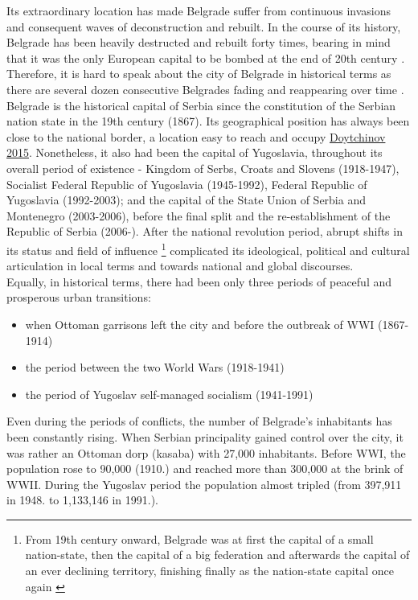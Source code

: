 \documentclass[11pt]{report}
\begin{document}
Its extraordinary location has made Belgrade suffer from continuous invasions and consequent waves of deconstruction and rebuilt. In the course of its history, Belgrade has been heavily destructed and rebuilt forty times, bearing in mind that it was the only European capital to be bombed at the end of 20th century \href{ref}{\citealt{doytchinov_belgrade_2015}}. Therefore, it is hard to speak about the city of Belgrade in historical terms as there are several  dozen  consecutive  Belgrades fading and reappearing over time \href{ref}{\citealt{grozdanic_belgrade_2008}}.
\\
Belgrade is the historical capital of Serbia since the constitution of the Serbian nation state in the 19th century (1867). Its geographical position has always been close to the national border, a location easy to reach and occupy \href{ref}{Doytchinov 2015}.
Nonetheless, it also had been the capital of Yugoslavia, throughout its overall period of existence - Kingdom of Serbs, Croats and Slovens (1918-1947), Socialist Federal Republic of Yugoslavia (1945-1992), Federal Republic of Yugoslavia (1992-2003); and the capital of the State Union of Serbia and Montenegro (2003-2006), before the final split and the re-establishment of the Republic of Serbia (2006-). After the national revolution period, abrupt shifts in its status and field of influence
\footnote{From 19th century onward, Belgrade was at first the capital of a small nation-state, then the capital of a big federation and afterwards the capital of an ever declining territory, finishing finally as the nation-state capital once again \href{ref}{\citealt{hirt_belgrade_2009}}}
complicated its ideological, political and cultural articulation in local terms and towards national and global discourses.
\\

Equally, in historical terms, there had been only three periods of peaceful and prosperous urban transitions:

\begin{itemize}
\item when Ottoman garrisons left the city and before the outbreak of WWI (1867-1914)
\item the period between the two World Wars (1918-1941)
\item  the period of Yugoslav self-managed socialism (1941-1991)
\end{itemize}

Even during the periods of conflicts, the number of Belgrade's inhabitants has been constantly rising. When Serbian principality gained control over the city, it was rather an Ottoman dorp (kasaba) with 27,000 inhabitants. Before WWI, the population rose to 90,000 (1910.) and reached more than 300,000 at the brink of WWII.
During the Yugoslav period the population almost tripled (from 397,911 in 1948. to 1,133,146 in 1991.).
\\
\end{document}
